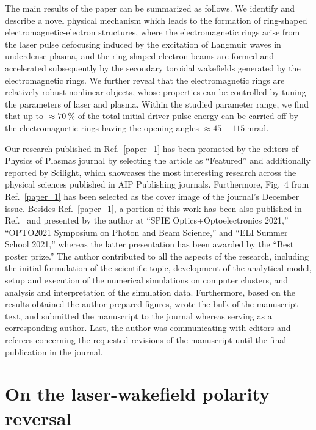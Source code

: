 \documentclass[10pt, a4paper, twoside, openright]{report}
\newcommand{\q}[1]{``#1''} %
\begin{document}
The main results of the paper can be summarized as follows. We identify and describe a novel physical mechanism which leads to the formation of ring-shaped electromagnetic-electron structures, where the electromagnetic rings arise from the laser pulse defocusing induced by the excitation of Langmuir waves in underdense plasma, and the ring-shaped electron beams are formed and accelerated subsequently by the secondary toroidal wakefields generated by the electromagnetic rings. We further reveal that the electromagnetic rings are relatively robust nonlinear objects, whose properties can be controlled by tuning the parameters of laser and plasma. Within the studied parameter range, we find that up to $ \approx 70 \ \% $ of the total initial driver pulse energy can be carried off by the electromagnetic rings having the opening angles $ \approx 45 - 115 \ \mathrm{mrad} $. 

Our research published in Ref.~\ref{paper_1} has been promoted by the editors of Physics of Plasmas journal by selecting the article as \q{Featured} and additionally reported by Scilight, which showcases the most interesting research across the physical sciences published in AIP Publishing journals. Furthermore, Fig.~4 from Ref.~\ref{paper_1} has been selected as the cover image of the journal's December issue. Besides Ref.~\ref{paper_1}, a portion of this work has been also published in Ref.~ and presented by the author at \q{SPIE Optics+Optoelectronics 2021,} \q{OPTO2021 Symposium on Photon and Beam Science,} and \q{ELI Summer School 2021,} whereas the latter presentation has been awarded by the \q{Best poster prize.} The author contributed to all the aspects of the research, including the initial formulation of the scientific topic, development of the analytical model, setup and execution of the numerical simulations on computer clusters, and analysis and interpretation of the simulation data. Furthermore, based on the results obtained the author prepared figures, wrote the bulk of the manuscript text, and submitted the manuscript to the journal whereas serving as a corresponding author. Last, the author was communicating with editors and referees concerning the requested revisions of the manuscript until the final publication in the journal.

\section{On the laser-wakefield polarity reversal\label{sec:on_the_laser-wakefield_polarity_reversal}}
%
\end{document}
